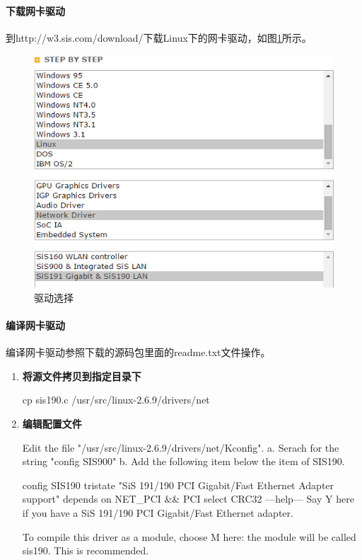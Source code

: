 \documentclass[paper=a4,fontsize=11pt]{article}
\begin{document}
	\paragraph{下载网卡驱动}
	到http://w3.sis.com/download/下载Linux下的网卡驱动，如图\ref{DownloadSisDriver}所示。
	\begin{figure}[htbp]
		\centering
		\includegraphics[scale=0.7]{DownloadSisDriver.jpg}
		\caption{驱动选择}
		\label{DownloadSisDriver}
	\end{figure}
	
	
	\paragraph{编译网卡驱动}
	编译网卡驱动参照下载的源码包里面的readme.txt文件操作。
	\begin{enumerate}
		\setcounter{enumi}{0}
		\item{\textbf{将源文件拷贝到指定目录下~~}}
		
		cp sis190.c /usr/src/linux-2.6.9/drivers/net
		
		\item{\textbf{编辑配置文件~~}}
		
		Edit the file "/usr/src/linux-2.6.9/drivers/net/Kconfig".
		a. Serach for the string "config SIS900"
		b. Add the following item below the item of SIS190.
		
		config SIS190\newline
		tristate "SiS 191/190 PCI Gigabit/Fast Ethernet Adapter support"\newline
		depends on NET\_PCI \&\& PCI\newline
		select CRC32\newline
		---help---\newline
		Say Y here if you have a SiS 191/190 PCI Gigabit/Fast Ethernet adapter.
		
		To compile this driver as a module, choose M here: the module
		will be called sis190.  This is recommended.
		
	\end{enumerate}
	
\end{document}
